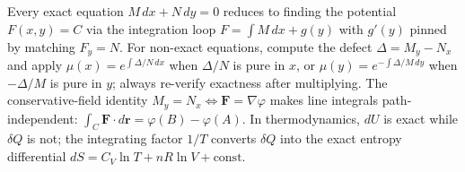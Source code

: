 \vspace{0.8em}

\begin{conceptbox}
Every exact equation $M\,dx+N\,dy=0$ reduces to finding the potential
\textcolor{accentorange}{$F(x,y)=C$} via the integration loop
\textcolor{accentorange}{$F=\int M\,dx+g(y)$} with $g'(y)$ pinned by matching
$F_y=N$. For non-exact equations, compute the defect
\textcolor{accentorange}{$\Delta=M_y-N_x$} and apply
\textcolor{accentorange}{$\mu(x)=e^{\int\Delta/N\,dx}$} when $\Delta/N$ is
pure in $x$, or \textcolor{accentorange}{$\mu(y)=e^{-\int\Delta/M\,dy}$} when
$-\Delta/M$ is pure in $y$; always re-verify exactness after multiplying. The
conservative-field identity \textcolor{accentorange}{$M_y=N_x\iff\mathbf{F}=\nabla\varphi$}
makes line integrals path-independent:
\textcolor{accentorange}{$\int_C\mathbf{F}\cdot d\mathbf{r}=\varphi(B)-\varphi(A)$}.
In thermodynamics, \textcolor{accentorange}{$dU$} is exact while
\textcolor{accentorange}{$\delta Q$} is not; the integrating factor
\textcolor{accentorange}{$1/T$} converts $\delta Q$ into the exact entropy
differential \textcolor{accentorange}{$dS=C_V\ln T + nR\ln V+\text{const}$}.
\end{conceptbox}


